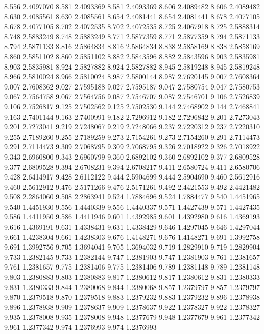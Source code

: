 8.556 2.4097070
8.581 2.4093369
8.581 2.4093369
8.606 2.4089482
8.606 2.4089482
8.630 2.4085561
8.630 2.4085561
8.654 2.4081441
8.654 2.4081441
8.678 2.4077105
8.678 2.4077105
8.702 2.4072535
8.702 2.4072535
8.725 2.4067918
8.725 2.5888314
8.748 2.5883249
8.748 2.5883249
8.771 2.5877359
8.771 2.5877359
8.794 2.5871133
8.794 2.5871133
8.816 2.5864834
8.816 2.5864834
8.838 2.5858169
8.838 2.5858169
8.860 2.5851102
8.860 2.5851102
8.882 2.5843596
8.882 2.5843596
8.903 2.5835981
8.903 2.5835981
8.924 2.5827882
8.924 2.5827882
8.945 2.5819248
8.945 2.5819248
8.966 2.5810024
8.966 2.5810024
8.987 2.5800144
8.987 2.7620145
9.007 2.7608364
9.007 2.7608362
9.027 2.7595188
9.027 2.7595187
9.047 2.7580754
9.047 2.7580753
9.067 2.7564758
9.067 2.7564756
9.087 2.7546707
9.087 2.7546701
9.106 2.7526839
9.106 2.7526817
9.125 2.7502562
9.125 2.7502530
9.144 2.7468902
9.144 2.7468841
9.163 2.7401144
9.163 2.7400991
9.182 2.7296912
9.182 2.7296842
9.201 2.7273043
9.201 2.7273041
9.219 2.7248067
9.219 2.7248066
9.237 2.7220312
9.237 2.7220310
9.255 2.7189260
9.255 2.7189259
9.273 2.7154261
9.273 2.7154260
9.291 2.7114473
9.291 2.7114473
9.309 2.7068795
9.309 2.7068795
9.326 2.7018922
9.326 2.7018922
9.343 2.6960800
9.343 2.6960799
9.360 2.6892102
9.360 2.6892102
9.377 2.6809528
9.377 2.6809528
9.394 2.6708231
9.394 2.6708217
9.411 2.6580724
9.411 2.6580706
9.428 2.6414917
9.428 2.6112122
9.444 2.5904699
9.444 2.5904690
9.460 2.5612916
9.460 2.5612912
9.476 2.5171266
9.476 2.5171261
9.492 2.4421553
9.492 2.4421482
9.508 2.2864060
9.508 2.2863941
9.524 1.7884696
9.524 1.7884477
9.540 1.4451965
9.540 1.4451930
9.556 1.4440339
9.556 1.4440337
9.571 1.4427439
9.571 1.4427435
9.586 1.4411950
9.586 1.4411946
9.601 1.4392985
9.601 1.4392980
9.616 1.4369193
9.616 1.4369191
9.631 1.4338431
9.631 1.4338429
9.646 1.4297045
9.646 1.4297044
9.661 1.4238304
9.661 1.4238303
9.676 1.4148271
9.676 1.4148271
9.691 1.3992758
9.691 1.3992756
9.705 1.3694041
9.705 1.3694032
9.719 1.2829910
9.719 1.2829904
9.733 1.2382145
9.733 1.2382144
9.747 1.2381903
9.747 1.2381903
9.761 1.2381657
9.761 1.2381657
9.775 1.2381406
9.775 1.2381406
9.789 1.2381148
9.789 1.2381148
9.803 1.2380883
9.803 1.2380883
9.817 1.2380612
9.817 1.2380612
9.831 1.2380333
9.831 1.2380333
9.844 1.2380068
9.844 1.2380068
9.857 1.2379797
9.857 1.2379797
9.870 1.2379518
9.870 1.2379518
9.883 1.2379232
9.883 1.2379232
9.896 1.2378938
9.896 1.2378938
9.909 1.2378637
9.909 1.2378637
9.922 1.2378327
9.922 1.2378327
9.935 1.2378008
9.935 1.2378008
9.948 1.2377679
9.948 1.2377679
9.961 1.2377342
9.961 1.2377342
9.974 1.2376993
9.974 1.2376993
